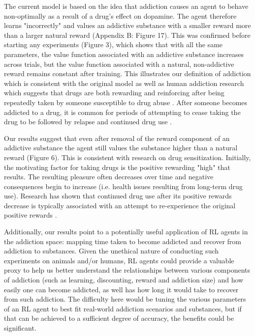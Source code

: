 \documentclass[10pt,letterpaper]{article}
\begin{document}
The current model is based on the idea that addiction causes an agent to behave non-optimally as a result of a drug's effect on dopamine. The agent therefore learns "incorrectly" and values an addictive substance with a smaller reward more than a larger natural reward \cite{ReddishJohnson2004, ReddishJensenJohnson2008} (Appendix B: Figure 17). This was confirmed before starting any experiments (Figure 3), which shows that with all the same parameters, the value function associated with an addictive substance increases across trials, but the value function associated with a natural, non-addictive reward remains constant after training. This illustrates our definition of addiction which is consistent with the original model \cite{ReddishJohnson2004} as well as human addiction research which suggests that drugs are both rewarding and reinforcing after being repeatedly taken by someone susceptible to drug abuse \cite{Hyman2001, Koob1992}. After someone becomes addicted to a drug, it is common for periods of attempting to cease taking the drug to be followed by relapse and continued drug use \cite{Hyman2001}.

Our results suggest that even after removal of the reward component of an addictive substance the agent still values the substance higher than a natural reward (Figure 6). This is consistent with research on drug sensitization. Initially, the motivating factor for taking drugs is the positive rewarding "high" that results. The resulting pleasure often decreases over time and negative consequences begin to increase (i.e. health issues resulting from long-term drug use). Research has shown that continued drug use after its positive rewards decrease is typically associated with an attempt to re-experience the original positive rewards \cite{Hyman2001, Koob1992}.

Additionally, our results point to a potentially useful application of RL agents in the addiction space: mapping time taken to become addicted and recover from addiction to substances. Given the unethical nature of conducting such experiments on animals and/or humans, RL agents could provide a valuable proxy to help us better understand the relationships between various components of addiction (such as learning, discounting, reward and addiction size) and how easily one can become addicted, as well has how long it would take to recover from such addiction. The difficulty here would be tuning the various parameters of an RL agent to best fit real-world addiction scenarios and substances, but if that can be achieved to a sufficient degree of accuracy, the benefits could be significant.
\end{document}
